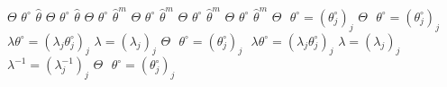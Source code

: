 \stopmpxshipout
\mpxshipout%
$\Theta$%
\stopmpxshipout
\mpxshipout%
$\theta^\circ$%
\stopmpxshipout
\mpxshipout%
$\widehat{\theta}$%
\stopmpxshipout
\mpxshipout%
$\Theta$%
\stopmpxshipout
\mpxshipout%
$\theta^\circ$%
\stopmpxshipout
\mpxshipout%
$\widehat{\theta}$%
\stopmpxshipout
\mpxshipout%
$\Theta$%
\stopmpxshipout
\mpxshipout%
$\theta^\circ$%
\stopmpxshipout
\mpxshipout%
$\widehat{\theta}^{m}$%
\stopmpxshipout
\mpxshipout%
$\Theta$%
\stopmpxshipout
\mpxshipout%
$\theta^\circ$%
\stopmpxshipout
\mpxshipout%
$\widehat{\theta}^m$%
\stopmpxshipout
\mpxshipout%
$\Theta$%
\stopmpxshipout
\mpxshipout%
$\theta^\circ$%
\stopmpxshipout
\mpxshipout%
$\widehat{\theta}^m$%
\stopmpxshipout
\mpxshipout%
$\Theta$%
\stopmpxshipout
\mpxshipout%
$\theta^\circ$%
\stopmpxshipout
\mpxshipout%
$\widehat{\theta}^m$%
\stopmpxshipout
\mpxshipout%
$\Theta$%
\stopmpxshipout
\mpxshipout%
$ $%
\stopmpxshipout
\mpxshipout%
$\theta^\circ=(\theta^\circ_j)_j$%
\stopmpxshipout
\mpxshipout%
$\Theta$%
\stopmpxshipout
\mpxshipout%
$ $%
\stopmpxshipout
\mpxshipout%
$\theta^\circ=(\theta^\circ_j)_j$%
\stopmpxshipout
\mpxshipout%
$ $%
\stopmpxshipout
\mpxshipout%
$\lambda\theta^\circ=(\lambda_j\theta^\circ_j)_j$%
\stopmpxshipout
\mpxshipout%
$\lambda=(\lambda_j)_j$%
\stopmpxshipout
\mpxshipout%
$\Theta$%
\stopmpxshipout
\mpxshipout%
$ $%
\stopmpxshipout
\mpxshipout%
$\theta^\circ=(\theta^\circ_j)_j$%
\stopmpxshipout
\mpxshipout%
$ $%
\stopmpxshipout
\mpxshipout%
$\lambda\theta^\circ=(\lambda_j\theta^\circ_j)_j$%
\stopmpxshipout
\mpxshipout%
$\lambda=(\lambda_j)_j$%
\stopmpxshipout
\mpxshipout%
$\lambda^{-1}=(\lambda^{-1}_j)_j$%
\stopmpxshipout
\mpxshipout%
$\Theta$%
\stopmpxshipout
\mpxshipout%
$ $%
\stopmpxshipout
\mpxshipout%
$\theta^\circ=(\theta^\circ_j)_j$%
